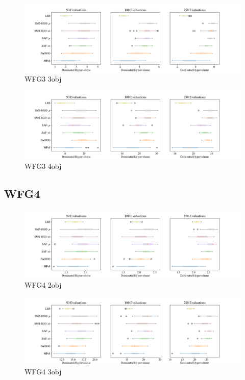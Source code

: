 \documentclass[
dvipsnames, table,   %
format=acmsmall,     %
anonymous=true,      %
authorversion=false, %
]{acmart}
\begin{document}
\begin{figure}[h]
    \centering
    \includegraphics[width=\textwidth]{figures/wfg3_3obj_10dim_hv_boxplot.pdf}
    \caption{WFG3 3obj}
    \label{fig:boxplot WFG3_3obj_10dim}
\end{figure}

\begin{figure}[h]
    \centering
    \includegraphics[width=\textwidth]{figures/wfg3_4obj_10dim_2_hv_boxplot.pdf}
    \caption{WFG3 4obj}
    \label{fig:boxplot WFG3_4obj_10dim}
\end{figure}
\clearpage

\subsection{WFG4}
\begin{figure}[h]
    \centering
    \includegraphics[width=\textwidth]{figures/wfg4_2obj_6dim_hv_boxplot.pdf}
    \caption{WFG4 2obj}
    \label{fig:boxplot WFG4_2obj_6dim}
\end{figure}

\begin{figure}[h]
    \centering
    \includegraphics[width=\textwidth]{figures/wfg4_3obj_8dim_hv_boxplot.pdf}
    \caption{WFG4 3obj}
    \label{fig:boxplot WFG4_3obj_8dim}
\end{figure}
\end{document}
